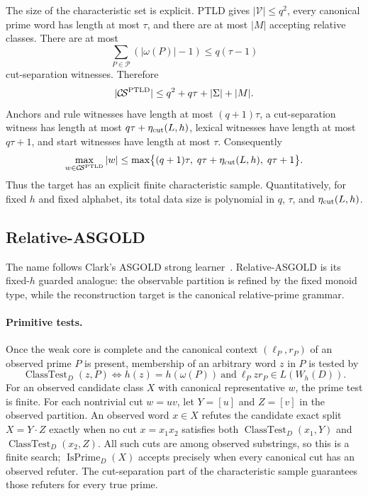 \documentclass[11pt,a4paper]{article}
\newcommand{\Pcal}{\mathcal P}
\newcommand{\Vcal}{\mathcal V}
\newcommand{\CS}{\mathcal{C}\!\mathcal{S}}
\begin{document}
The size of the characteristic set is explicit.  PTLD gives $|\Vcal|\le q^2$, every canonical prime word has length at most $\tau$, and there are at most $|M|$ accepting relative classes.  There are at most
\[
  \sum_{P\in\Pcal}(|\omega(P)|-1)\le q(\tau-1)
\]
cut-separation witnesses.  Therefore
\[
  |\CS^{\rm PTLD}| \le q^2+q\tau+|\Sigma|+|M|.
\]
Anchors and rule witnesses have length at most $(q+1)\tau$, a cut-separation witness has length at most $q\tau+\eta_{\rm cut}(L,h)$, lexical witnesses have length at most $q\tau+1$, and start witnesses have length at most $\tau$.  Consequently
\[
  \max_{w\in\CS^{\rm PTLD}}|w|
  \le
  \max\bigl\{(q+1)\tau,\;q\tau+\eta_{\rm cut}(L,h),\;q\tau+1\bigr\}.
\]
Thus the target has an explicit finite characteristic sample.  Quantitatively, for fixed $h$ and fixed alphabet, its total data size is polynomial in $q$, $\tau$, and $\eta_{\rm cut}(L,h)$.

\subsection{Relative-ASGOLD}

The name follows Clark's ASGOLD strong learner~\cite{Clark2013Trees}.  Relative-ASGOLD is its fixed-$h$ guarded analogue: the observable partition is refined by the fixed monoid type, while the reconstruction target is the canonical relative-prime grammar.

\paragraph{Primitive tests.}
Once the weak core is complete and the canonical context $(\ell_P,r_P)$ of an observed prime $P$ is present, membership of an arbitrary word $z$ in $P$ is tested by
\[
  \operatorname{ClassTest}_D(z,P)
  \iff
  h(z)=h(\omega(P))
  \ \text{and}\ 
  \ell_P z r_P\in L(W_h(D)).
\]
For an observed candidate class $X$ with canonical representative $w$, the prime test is finite.  For each nontrivial cut $w=uv$, let $Y=[u]$ and $Z=[v]$ in the observed partition.  An observed word $x\in X$ refutes the candidate exact split $X=Y\cdot Z$ exactly when no cut $x=x_1x_2$ satisfies both $\operatorname{ClassTest}_D(x_1,Y)$ and $\operatorname{ClassTest}_D(x_2,Z)$.  All such cuts are among observed substrings, so this is a finite search; $\operatorname{IsPrime}_D(X)$ accepts precisely when every canonical cut has an observed refuter.  The cut-separation part of the characteristic sample guarantees those refuters for every true prime.
\end{document}
